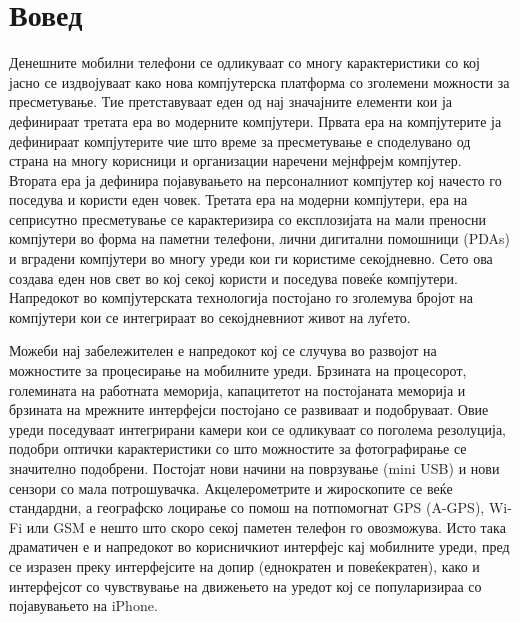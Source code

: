 \chapter{Вовед}
Денешните мобилни телефони се одликуваат со многу карактеристики со кој јасно се
издвојуваат како нова компјутерска платформа со зголемени можности за
пресметување. Тие претставуваат еден од нај значајните елементи кои ја
дефинираат третата ера во модерните компјутери. Првата ера на компјутерите ја
дефинираат компјутерите чие што време за пресметување е споделувано од страна на
многу корисници и организации наречени мејнфрејм компјутер. Втората ера ја
дефинира појавувањето на персоналниот компјутер кој начесто го поседува и
користи еден човек. Третата ера на модерни компјутери, ера на сеприсутно
пресметување се карактеризира со експлозијата на мали преносни компјутери во
форма на паметни телефони, лични дигитални помошници (PDAs) и вградени
компјутери во многу уреди кои ги користиме секојдневно. Сето ова создава еден
нов свет во кој секој користи и поседува повеќе компјутери. Напредокот во
компјутерската технологија постојано го зголемува бројот на компјутери кои се
интегрираат во секојдневниот живот на луѓето.

Можеби нај забележителен е напредокот кој се случува во развојот на можностите
за процесирање на мобилните уреди. Брзината на процесорот, големината на
работната меморија, капацитетот на постојаната меморија и брзината на мрежните
интерфејси постојано се развиваат и подобруваат. Овие уреди поседуваат
интегрирани камери кои се одликуваат со поголема резолуција, подобри оптички
карактеристики со што можностите за фотографирање се значително подобрени.
Постојат нови начини на поврзување (mini USB) и нови сензори со мала
потрошувачка. Акцелерометрите и жироскопите се веќе стандардни, а географско
лоцирање со помош на потпомогнат GPS (A-GPS), Wi-Fi или GSM е нешто што скоро
секој паметен телефон го овозможува. Исто така драматичен е и напредокот во
корисничкиот интерфејс кај мобилните уреди, пред се изразен преку интерфејсите
на допир (еднократен и повеќекратен), како и интерфејсот со чувствување на
движењето на уредот кој се популаризираа со појавувањето на iPhone.

